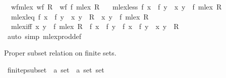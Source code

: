 \begin{isabellebody}
\isanewline
{}\isamarkupfalse%
\isanewline
\ \ wf{\isacharunderscore}{\kern0pt}mlex{\isacharcolon}{\kern0pt}\ {\isachardoublequoteopen}wf\ R\ {\isasymLongrightarrow}\ wf\ {\isacharparenleft}{\kern0pt}f\ {\isacharless}{\kern0pt}{\isacharasterisk}{\kern0pt}mlex{\isacharasterisk}{\kern0pt}{\isachargreater}{\kern0pt}\ R{\isacharparenright}{\kern0pt}{\isachardoublequoteclose}\ \isanewline
\ \ mlex{\isacharunderscore}{\kern0pt}less{\isacharcolon}{\kern0pt}\ {\isachardoublequoteopen}f\ x\ {\isacharless}{\kern0pt}\ f\ y\ {\isasymLongrightarrow}\ {\isacharparenleft}{\kern0pt}x{\isacharcomma}{\kern0pt}\ y{\isacharparenright}{\kern0pt}\ {\isasymin}\ f\ {\isacharless}{\kern0pt}{\isacharasterisk}{\kern0pt}mlex{\isacharasterisk}{\kern0pt}{\isachargreater}{\kern0pt}\ R{\isachardoublequoteclose}\ \isanewline
\ \ mlex{\isacharunderscore}{\kern0pt}leq{\isacharcolon}{\kern0pt}\ {\isachardoublequoteopen}f\ x\ {\isasymle}\ f\ y\ {\isasymLongrightarrow}\ {\isacharparenleft}{\kern0pt}x{\isacharcomma}{\kern0pt}\ y{\isacharparenright}{\kern0pt}\ {\isasymin}\ R\ {\isasymLongrightarrow}\ {\isacharparenleft}{\kern0pt}x{\isacharcomma}{\kern0pt}\ y{\isacharparenright}{\kern0pt}\ {\isasymin}\ f\ {\isacharless}{\kern0pt}{\isacharasterisk}{\kern0pt}mlex{\isacharasterisk}{\kern0pt}{\isachargreater}{\kern0pt}\ R{\isachardoublequoteclose}\ \isanewline
\ \ mlex{\isacharunderscore}{\kern0pt}iff{\isacharcolon}{\kern0pt}\ {\isachardoublequoteopen}{\isacharparenleft}{\kern0pt}x{\isacharcomma}{\kern0pt}\ y{\isacharparenright}{\kern0pt}\ {\isasymin}\ f\ {\isacharless}{\kern0pt}{\isacharasterisk}{\kern0pt}mlex{\isacharasterisk}{\kern0pt}{\isachargreater}{\kern0pt}\ R\ {\isasymlongleftrightarrow}\ f\ x\ {\isacharless}{\kern0pt}\ f\ y\ {\isasymor}\ f\ x\ {\isacharequal}{\kern0pt}\ f\ y\ {\isasymand}\ {\isacharparenleft}{\kern0pt}x{\isacharcomma}{\kern0pt}\ y{\isacharparenright}{\kern0pt}\ {\isasymin}\ R{\isachardoublequoteclose}\isanewline
%
\isadelimproof
\ \ %
\endisadelimproof
%
\isatagproof
{}\isamarkupfalse%
\ {\isacharparenleft}{\kern0pt}auto\ simp{\isacharcolon}{\kern0pt}\ mlex{\isacharunderscore}{\kern0pt}prod{\isacharunderscore}{\kern0pt}def{\isacharparenright}{\kern0pt}%
\endisatagproof
{\isafoldproof}%
%
\isadelimproof
%
\endisadelimproof
%
\begin{isamarkuptext}%
Proper subset relation on finite sets.%
\end{isamarkuptext}\isamarkuptrue%
\isamarkupfalse%
\ finite{\isacharunderscore}{\kern0pt}psubset\ {\isacharcolon}{\kern0pt}{\isacharcolon}{\kern0pt}\ {\isachardoublequoteopen}{\isacharparenleft}{\kern0pt}{\isacharprime}{\kern0pt}a\ set\ {\isasymtimes}\ {\isacharprime}{\kern0pt}a\ set{\isacharparenright}{\kern0pt}\ set{\isachardoublequoteclose}\isanewline

\end{isabellebody}
